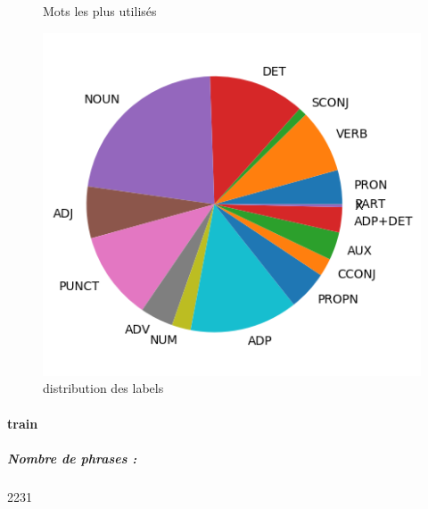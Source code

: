 \begin{figure}[H]
\begin{minipage}{0.48\textwidth}
\begin{tabular}{|l || *{11 }{|c} |}
\end{tabular}
\caption{ Mots les plus utilisés } \label{Fig:muw}\end{minipage} 
\begin{minipage}{0.48\textwidth} \centering
\includegraphics[width=.7\linewidth]{sequoiatest_img.png}
\caption{distribution des labels}
\end{minipage}
\end{figure} \paragraph{train } 
\subparagraph{Nombre de phrases :} 2231\\ 
